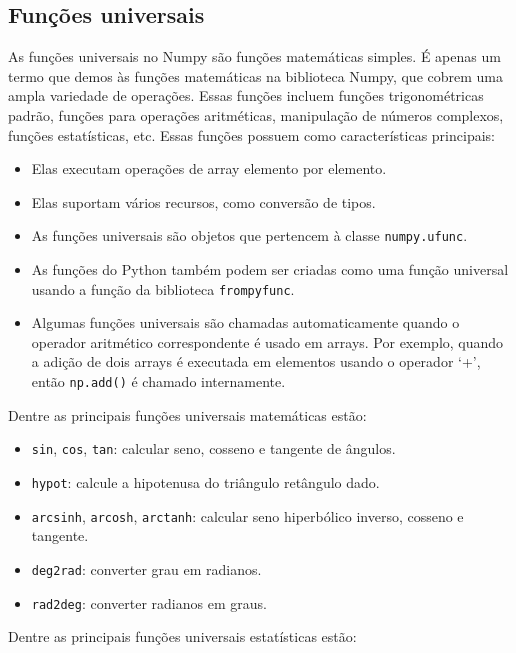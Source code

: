 \documentclass[
  brazilian,
  letterpaper,
  DIV=11,
  numbers=noendperiod]{scrreprt}
\providecommand{\tightlist}{%
  \setlength{\itemsep}{0pt}\setlength{\parskip}{0pt}}
\begin{document}
\subsection{Funções universais}\label{funuxe7uxf5es-universais}

As funções universais no Numpy são funções matemáticas simples. É apenas
um termo que demos às funções matemáticas na biblioteca Numpy, que
cobrem uma ampla variedade de operações. Essas funções incluem funções
trigonométricas padrão, funções para operações aritméticas, manipulação
de números complexos, funções estatísticas, etc. Essas funções possuem
como características principais:

\begin{itemize}
\tightlist
\item
  Elas executam operações de array elemento por elemento.
\item
  Elas suportam vários recursos, como conversão de tipos.
\item
  As funções universais são objetos que pertencem à classe
  \texttt{numpy.ufunc}.
\item
  As funções do Python também podem ser criadas como uma função
  universal usando a função da biblioteca \texttt{frompyfunc}.
\item
  Algumas funções universais são chamadas automaticamente quando o
  operador aritmético correspondente é usado em arrays. Por exemplo,
  quando a adição de dois arrays é executada em elementos usando o
  operador `+', então \texttt{np.add()} é chamado internamente.
\end{itemize}

Dentre as principais funções universais matemáticas estão:

\begin{itemize}
\tightlist
\item
  \texttt{sin}, \texttt{cos}, \texttt{tan}: calcular seno, cosseno e
  tangente de ângulos.
\item
  \texttt{hypot}: calcule a hipotenusa do triângulo retângulo dado.
\item
  \texttt{arcsinh}, \texttt{arcosh}, \texttt{arctanh}: calcular seno
  hiperbólico inverso, cosseno e tangente.
\item
  \texttt{deg2rad}: converter grau em radianos.
\item
  \texttt{rad2deg}: converter radianos em graus.
\end{itemize}

Dentre as principais funções universais estatísticas estão:
\end{document}
